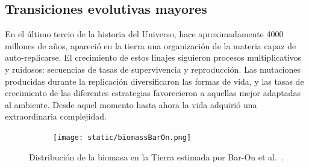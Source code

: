 \documentclass[a4paper,11pt]{book}
\theoremstyle{definition}
\begin{document}
\subsection{Transiciones evolutivas mayores}

En el último tercio de la historia del Universo, hace aproximadamente 4000 millones de años, apareció en la tierra una organización de la materia capaz de auto-replicarse.
%
El crecimiento de estos linajes siguieron procesos multiplicativos y ruidosos: secuencias de tasas de supervivencia y reproducción.
%
Las mutaciones producidas durante la replicación diversificaron las formas de vida, y las tasas de crecimiento de las diferentes estrategias favorecieron a aquellas mejor adaptadas al ambiente.
%
Desde aquel momento hasta ahora la vida adquirió una extraordinaria complejidad.

%

\begin{figure}[ht!]
    \centering
    \begin{subfigure}[b]{0.65\textwidth}
    \texttt{[image: static/biomassBarOn.png]}
    \end{subfigure}
    \caption{
	Distribución de la biomasa en la Tierra estimada por Bar-On et al.~\cite{barOn2018-biomass}.
    }
    \label{fig:biomass}
\end{figure}

\end{document}
